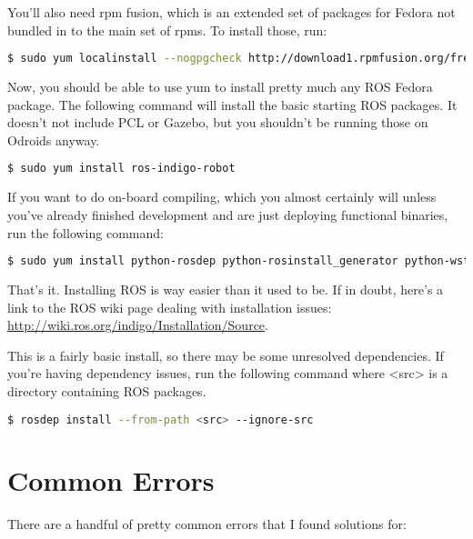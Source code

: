 You'll also need rpm fusion, which is an extended set of packages for Fedora not bundled in to the main set of rpms. To install those, run:

\begin{lstlisting}[language=bash]
  $ sudo yum localinstall --nogpgcheck http://download1.rpmfusion.org/free/fedora/rpmfusion-free-release-$(rpm  -E %fedora).noarch.rpm http://download1.rpmfusion.org/nonfree/fedora/rpmfusion-nonfree-release-$(rpm -E %fedora).noarch.rpm	
\end{lstlisting}

Now, you should be able to use yum to install pretty much any ROS Fedora package. The following command will install the basic starting ROS packages. It doesn't not include PCL or Gazebo, but you shouldn't be running those on Odroids anyway.

\begin{lstlisting}[language=bash]
  $ sudo yum install ros-indigo-robot	
\end{lstlisting}

If you want to do on-board compiling, which you almost certainly will unless you've already finished development and are just deploying functional binaries, run the following command:

\begin{lstlisting}[language=bash]
  $ sudo yum install python-rosdep python-rosinstall_generator python-wstool python-rosinstall @buildsys-build	
\end{lstlisting}

That's it. Installing ROS is way easier than it used to be. If in doubt, here's a link to the ROS wiki page dealing with installation issues: \url{http://wiki.ros.org/indigo/Installation/Source}.

This is a fairly basic install, so there may be some unresolved dependencies. If you're having dependency issues, run the following command where <src> is a directory containing ROS packages.

\begin{lstlisting}[language=bash]
  $ rosdep install --from-path <src> --ignore-src	
\end{lstlisting}

\section{Common Errors}

There are a handful of pretty common errors that I found solutions for:

